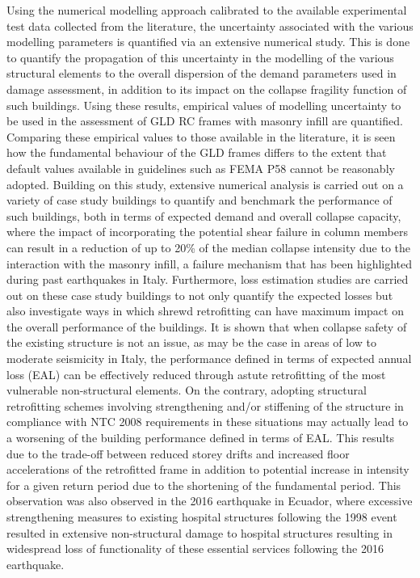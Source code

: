 Using the numerical modelling approach calibrated to the available experimental test data collected from the literature, the uncertainty associated with the various modelling parameters is quantified via an extensive numerical study. This is done to quantify the propagation of this uncertainty in the modelling of the various structural elements to the overall dispersion of the demand parameters used in damage assessment, in addition to its impact on the collapse fragility function of such buildings. Using these results, empirical values of modelling uncertainty to be used in the assessment of GLD RC frames with masonry infill are quantified. Comparing these empirical values to those available in the literature, it is seen how the fundamental behaviour of the GLD frames differs to the extent that default values available in guidelines such as FEMA P58 cannot be reasonably adopted. Building on this study, extensive numerical analysis is carried out on a variety of case study buildings to quantify and benchmark the performance of such buildings, both in terms of expected demand and overall collapse capacity, where the impact of incorporating the potential shear failure in column members can result in a reduction of up to 20\% of the median collapse intensity due to the interaction with the masonry infill, a failure mechanism that has been highlighted during past earthquakes in Italy. Furthermore, loss estimation studies are carried out on these case study buildings to not only quantify the expected losses but also investigate ways in which shrewd retrofitting can have maximum impact on the overall performance of the buildings. It is shown that when collapse safety of the existing structure is not an issue, as may be the case in areas of low to moderate seismicity in Italy, the performance defined in terms of expected annual loss (EAL) can be effectively reduced through astute retrofitting of the most vulnerable non-structural elements. On the contrary, adopting structural retrofitting schemes involving strengthening and/or stiffening of the structure in compliance with NTC 2008 requirements in these situations may actually lead to a worsening of the building performance defined in terms of EAL. This results due to the trade-off between reduced storey drifts and increased floor accelerations of the retrofitted frame in addition to potential increase in intensity for a given return period due to the shortening of the fundamental period. This observation was also observed in the 2016 earthquake in Ecuador, where excessive strengthening measures to existing hospital structures following the 1998 event resulted in extensive non-structural damage to hospital structures resulting in widespread loss of functionality of these essential services following the 2016 earthquake.

